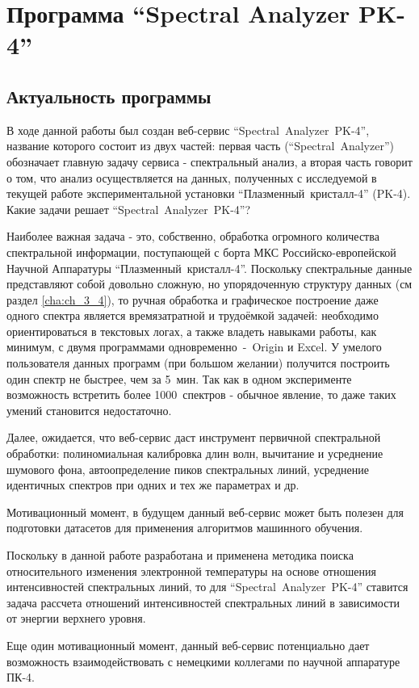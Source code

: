 \chapter{Программа “Spectral Analyzer PK-4”}
\label{cha:ch_4}
\section{Актуальность программы}
В ходе данной работы был создан веб-сервис “Spectral~Analyzer~PK-4”, название которого состоит из двух частей:
первая часть (“Spectral~Analyzer”) обозначает главную задачу сервиса - спектральный анализ, а вторая часть говорит
о том, что анализ осуществляется на данных, полученных с исследуемой в текущей работе экспериментальной установки
“Плазменный~кристалл-4” (PK-4). Какие задачи решает “Spectral~Analyzer~PK-4”?

Наиболее важная задача - это, собственно, обработка огромного количества спектральной информации, поступающей с борта МКС
Российско-европейской Научной Аппаратуры “Плазменный~кристалл-4”. Поскольку спектральные данные представляют собой
довольно сложную, но упорядоченную структуру данных (см раздел \ref{cha:ch_3_4}), то ручная обработка и
графическое построение даже одного спектра является времязатратной и трудоёмкой задачей: необходимо ориентироваться
в текстовых логах, а также владеть навыками работы, как минимум, с двумя программами одновременно~-~Origin и Exсel.
У умелого пользователя данных программ (при большом желании) получится построить один спектр не быстрее, чем за 5~мин.
Так как в одном эксперименте возможность встретить более 1000~спектров - обычное явление, то даже таких умений становится недостаточно.

Далее, ожидается, что веб-сервис даст инструмент первичной спектральной обработки: полиномиальная калибровка длин волн,
вычитание и усреднение шумового фона, автоопределение пиков спектральных линий, усреднение идентичных спектров при одних
и тех же параметрах и др.

Мотивационный момент, в будущем данный веб-сервис может быть полезен для подготовки датасетов для применения алгоритмов
машинного обучения.

Поскольку в данной работе разработана и применена методика поиска относительного изменения электронной температуры на основе
отношения интенсивностей спектральных линий, то для “Spectral~Analyzer~PK-4” ставится задача рассчета отношений интенсивностей
спектральных линий в зависимости от энергии верхнего уровня.

Еще один мотивационный момент, данный веб-сервис потенциально дает возможность взаимодействовать
с немецкими коллегами по научной аппаратуре ПК-4.

